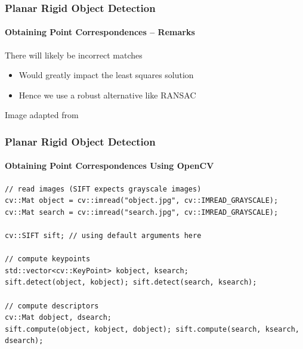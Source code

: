 \documentclass[xetex,professionalfont]{beamer}
\begin{document}
\begin{frame}
\frametitle{Planar Rigid Object Detection}
\framesubtitle{Obtaining Point Correspondences -- Remarks}

There will likely be incorrect matches
\begin{itemize}
    \item Would greatly impact the least squares solution
    \item Hence we use a robust alternative like RANSAC
\end{itemize}

\bigskip
\begin{center}
    {\centering Image adapted from \cite{prince12}}
\end{center}

\end{frame}


\begin{frame}[fragile]
\frametitle{Planar Rigid Object Detection}
\framesubtitle{Obtaining Point Correspondences Using OpenCV}

\footnotesize
\begin{verbatim}
// read images (SIFT expects grayscale images)
cv::Mat object = cv::imread("object.jpg", cv::IMREAD_GRAYSCALE);
cv::Mat search = cv::imread("search.jpg", cv::IMREAD_GRAYSCALE);

cv::SIFT sift; // using default arguments here

// compute keypoints
std::vector<cv::KeyPoint> kobject, ksearch;
sift.detect(object, kobject); sift.detect(search, ksearch);

// compute descriptors
cv::Mat dobject, dsearch;
sift.compute(object, kobject, dobject); sift.compute(search, ksearch, dsearch);
\end{verbatim}

\end{frame}

\end{document}
